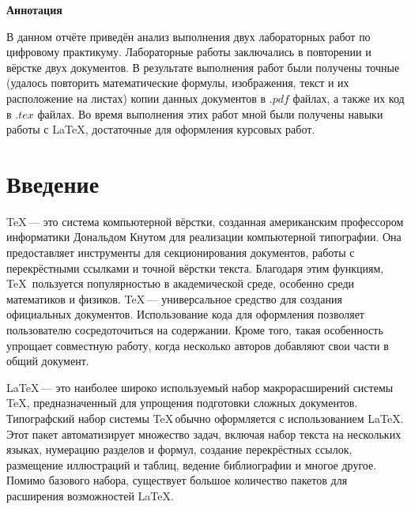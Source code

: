 \documentclass[a4paper, final]{article}
\begin{document}
{
\begin{center}
    {\large\bf Аннотация}
\end{center}

В данном отчёте приведён анализ выполнения двух  
лабораторных работ по цифровому практикуму. Лабораторные работы заключались  
в повторении и вёрстке двух документов. В результате выполнения работ были  
получены точные (удалось повторить математические формулы, изображения, текст  
и их расположение на листах) копии данных документов в $.pdf$ файлах, а также  
их код в $.tex$ файлах. Во время выполнения этих работ мной были получены навыки  
работы с \LaTeX{}, достаточные для оформления курсовых работ.  

\newpage
}




\tableofcontents
\newpage
    
    


{
\section*{Введение}

\TeX \,— это система компьютерной вёрстки, созданная американским профессором информатики Дональдом Кнутом для реализации компьютерной типографии. Она предоставляет инструменты для секционирования документов, работы с перекрёстными ссылками и точной вёрстки текста. Благодаря этим функциям, \TeX \, пользуется популярностью в академической среде, особенно среди математиков и физиков.
\TeX \,— универсальное средство для создания официальных документов. Использование кода для оформления позволяет пользователю сосредоточиться на содержании. Кроме того, такая особенность упрощает совместную работу, когда несколько авторов добавляют свои части в общий документ.

\LaTeX \,— это наиболее широко используемый набор макрорасширений системы \TeX, предназначенный для упрощения подготовки сложных документов. Типографский набор системы \TeX \,обычно оформляется с использованием \LaTeX. Этот пакет автоматизирует множество задач, включая набор текста на нескольких языках, нумерацию разделов и формул, создание перекрёстных ссылок, размещение иллюстраций и таблиц, ведение библиографии и многое другое. Помимо базового набора, существует большое количество пакетов для расширения возможностей \LaTeX.\cite{wayne-uni:What are LaTeX Packages?}

\newpage
}
\end{document}
